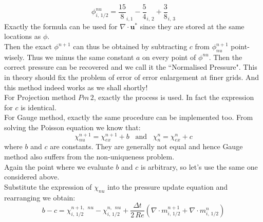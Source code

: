 \begin{equation}
\phi^{nu}_{i,\,1/2} = \dfrac{15}{8}_{i,1} - \dfrac{5}{4}_{i,\,2}+\dfrac{3}{8}_{i,\,3}
\end{equation}
Exactly the formula can be used for $\nabla \cdot \textbf{u}^*$ since they are stored at the same locations as $\phi$.\\

Then the exact $\phi^{n+1}$ can thus be obtained by subtracting $c$ from $\phi^{n+1}_{nu}$ point-wisely. Thus we minus the same constant $a$ on every point of $\phi^{nu}$. Then the correct pressure can be recovered and we call it the ``Normalised Pressure". This in theory should fix the problem of error of error enlargement at finer grids. And this method indeed works as we shall shortly!\\

For Projection method $Pm\,2$, exactly the process is used. In fact the expression for $c$ is identical.\\

For Gauge method, exactly the same procedure can be implemented too. From solving the Poisson equation we know that:
\begin{equation}
\chi^{n+1}_{nu} = \chi^{n+1}_{ex} + b\,\,\,\text{ and }\,\,\,\chi^{n}_{n} = \chi^n_{ex} + c
\end{equation}
where $b$ and $c$ are constants. They are generally not equal and hence Gauge method also suffers from the non-uniqueness problem.\\

Again the point where we evaluate $b$ and $c$ is arbitrary, so let's use the same one considered above.\\
Substitute the expression of $\chi_{nu}$ into the pressure update equation and rearranging we obtain:
\begin{equation}
b - c = \chi^{n+1,\,\,\,nu}_{i,\,1/2} - \chi^{n,\,\,\,nu}_{i,\,1/2} + \dfrac{\Delta t}{2\,Re}(\nabla \cdot m^{n+1}_{i,\,1/2} + \nabla \cdot m^n_{i,\,1/2})
\end{equation}
